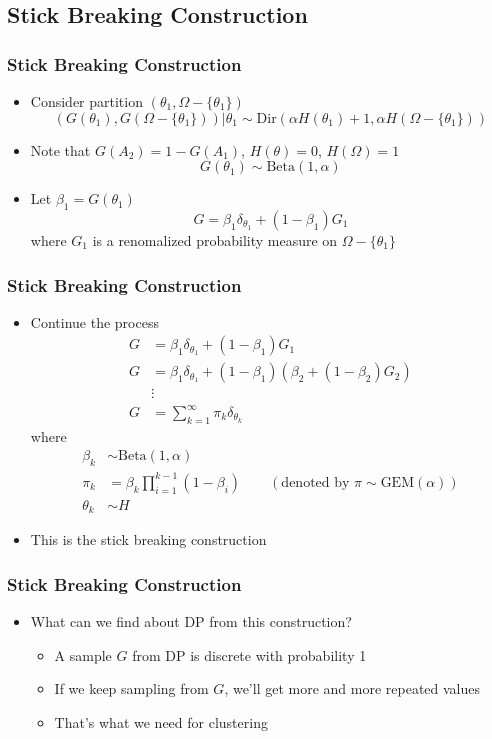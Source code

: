 \documentclass{beamer}
\begin{document}
\subsection{Stick Breaking Construction}
\begin{frame}
	\frametitle{Stick Breaking Construction}
	\begin{itemize}
		\item { Consider partition $(\theta_1, \Omega - \{\theta_1\}) $}
		\[
			(G(\theta_1), G(\Omega - \{\theta_1\}))|\theta_1 \sim \text{Dir}(\alpha H(\theta_1)+1, \alpha H(\Omega - \{\theta_1\}))
		\]
		\item Note that $G(A_2) = 1-G(A_1)$, $H(\theta)=0$, $H(\Omega)=1$
		\[
			G(\theta_1) \sim \text{Beta}(1, \alpha)
		\]
		\item Let $\beta_1 = G(\theta_1)$
		\[
			G = \beta_1 \delta_{\theta_1} + (1-\beta_1)G_1
		\]
		where $G_1$ is a renomalized probability measure on $\Omega - \{\theta_1\}$
	\end{itemize}
\end{frame}
\begin{frame}
	\frametitle{Stick Breaking Construction}
	\begin{itemize}
		\item {Continue the process}
		\begin{align*}
			G & =\beta_1 \delta_{\theta_1} + (1-\beta_1)G_1 \\
			G & =\beta_1 \delta_{\theta_1} + (1-\beta_1)(\beta_2 + (1-\beta_2)G_2) \\
			& \vdots \\
			G &= \sum_{k=1}^{\infty} \pi_k \delta_{\theta_k}
		\end{align*}
		where 
		\begin{align*}
		\beta_k & \sim \text{Beta}(1, \alpha) \\
		\pi_k & = \beta_k \prod_{i=1}^{k-1} (1-\beta_i) \qquad (\text{denoted by } \pi \sim \text{GEM}(\alpha))\\
		\theta_k & \sim H
		\end{align*}
		\item This is the stick breaking construction
	\end{itemize}
\end{frame}

\begin{frame}
	\frametitle{Stick Breaking Construction}
	\begin{itemize}
		\item What can we find about DP from this construction?
		\begin{itemize}
		\item A sample $G$ from DP is discrete with probability 1
		\item If we keep sampling from $G$, we'll get more and more repeated values
		\item That's what we need for clustering
		\end{itemize}
	\end{itemize}
\end{frame}
\end{document}
